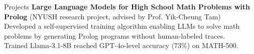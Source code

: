 \begin{rubric}{Projects}
%
	\textbf{Large Language Models for High School Math Problems with Prolog} (NYUSH research project, advised by Prof. Yik-Cheung Tam)\\
	Developed a self-supervised training algorithm enabling LLMs to solve math problems by generating Prolog programs without human-labeled traces.\\
	Trained Llama-3.1-8B reached GPT-4o-level accuracy (73\%) on MATH-500.
\end{rubric}

